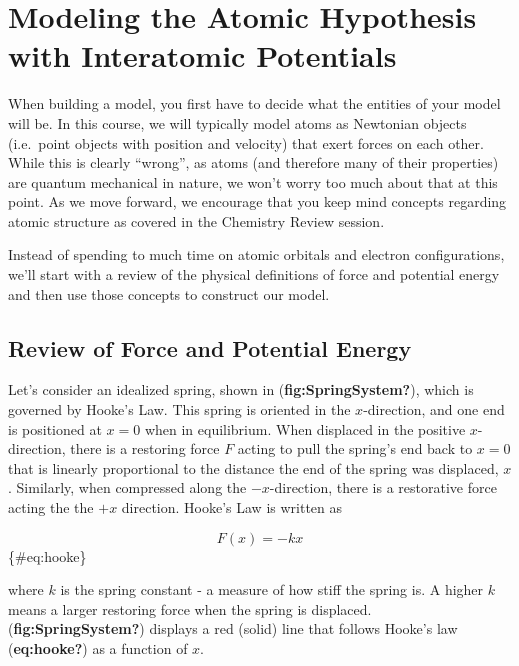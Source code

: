 \documentclass{book}
\begin{document}
\hypertarget{modeling-the-atomic-hypothesis-with-interatomic-potentials}{%
\section{Modeling the Atomic Hypothesis with Interatomic
Potentials}\label{modeling-the-atomic-hypothesis-with-interatomic-potentials}}

When building a model, you first have to decide what the entities of your
model will be. In this course, we will typically model atoms as Newtonian
objects (i.e.~point objects with position and velocity) that exert forces on
each other. While this is clearly ``wrong'', as atoms (and therefore many of
their properties) are quantum mechanical in nature, we won't worry too much
about that at this point. As we move forward, we encourage that you keep mind
concepts regarding atomic structure as covered in the Chemistry Review
session.

Instead of spending to much time on atomic orbitals and electron
configurations, we'll start with a review of the physical definitions of force
and potential energy and then use those concepts to construct our model.

\hypertarget{review-of-force-and-potential-energy}{%
\subsection{Review of Force and Potential
Energy}\label{review-of-force-and-potential-energy}}

Let's consider an idealized spring, shown in (\textbf{fig:SpringSystem?}),
which is governed by Hooke's Law. This spring is oriented in the
\(x\)-direction, and one end is positioned at \(x = 0\) when in equilibrium.
When displaced in the positive \(x\)-direction, there is a restoring force
\(F\) acting to pull the spring's end back to \(x=0\) that is linearly
proportional to the distance the end of the spring was displaced, \(x\).
Similarly, when compressed along the \(-x\)-direction, there is a restorative
force acting the the \(+x\) direction. Hooke's Law is written as

\[
  F(x) = -k x
\]\{\#eq:hooke\}

where \(k\) is the spring constant - a measure of how stiff the spring is. A
higher \(k\) means a larger restoring force when the spring is displaced.
(\textbf{fig:SpringSystem?}) displays a red (solid) line that follows Hooke's
law (\textbf{eq:hooke?}) as a function of \(x\).
\end{document}
